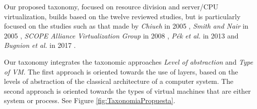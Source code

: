 	
	
	
	
Our proposed taxonomy, focused on resource division and server/CPU virtualization, builds based on the twelve reviewed studies, but is particularly focused on the studies such as that made by \textit{Chiueh} in 2005 \cite{Chiueh2005}, \textit{Smith and Nair} in 2005 \cite{Smith2005}, \textit{SCOPE Alliance Virtualization Group} in 2008 \cite{SCOPEAlliance2008}, \textit{P{\'e}k et al.} in 2013 \cite{Pek2013} and \textit{Bugnion et al.} in 2017 \cite{Bugnion2017}.
	
	Our taxonomy integrates the taxonomic approaches \textit{Level of abstraction} and \textit{Type of VM}. The first approach is oriented towards the use of layers, based on the levels of abstraction of the classical architecture of a computer system. The second approach is oriented towards the types of virtual machines that are either system or process. See Figure \ref{fig:TaxonomiaPropuesta}. 
	
	
	
	
